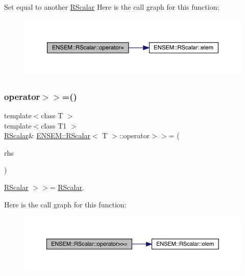 Set equal to another \mbox{\hyperlink{classENSEM_1_1RScalar}{R\+Scalar}} Here is the call graph for this function\+:
\nopagebreak
\begin{figure}[H]
\begin{center}
\leavevmode
\includegraphics[width=350pt]{d0/d8c/classENSEM_1_1RScalar_a81b105339878a490866e9467135ae4fa_cgraph}
\end{center}
\end{figure}
\mbox{\label{classENSEM_1_1RScalar_a35379cd7317c2c533aa26e3c15a9b03f}} 
\subsubsection{\texorpdfstring{operator$>$$>$=()}{operator>>=()}\hspace{0.1cm}{\footnotesize\ttfamily [1/2]}}
{\footnotesize\ttfamily template$<$class T $>$ \\
template$<$class T1 $>$ \\
\mbox{\hyperlink{classENSEM_1_1RScalar}{R\+Scalar}}\& \mbox{\hyperlink{classENSEM_1_1RScalar}{E\+N\+S\+E\+M\+::\+R\+Scalar}}$<$ T $>$\+::operator$>$$>$= (\begin{DoxyParamCaption}\item[{const \mbox{\hyperlink{classENSEM_1_1RScalar}{R\+Scalar}}$<$ T1 $>$ \&}]{rhs }\end{DoxyParamCaption})\hspace{0.3cm}{\ttfamily [inline]}}



\mbox{\hyperlink{classENSEM_1_1RScalar}{R\+Scalar}} $>$$>$= \mbox{\hyperlink{classENSEM_1_1RScalar}{R\+Scalar}}. 

Here is the call graph for this function\+:
\nopagebreak
\begin{figure}[H]
\begin{center}
\leavevmode
\includegraphics[width=350pt]{d0/d8c/classENSEM_1_1RScalar_a35379cd7317c2c533aa26e3c15a9b03f_cgraph}
\end{center}
\end{figure}
\mbox{\label{classENSEM_1_1RScalar_a35379cd7317c2c533aa26e3c15a9b03f}} 
